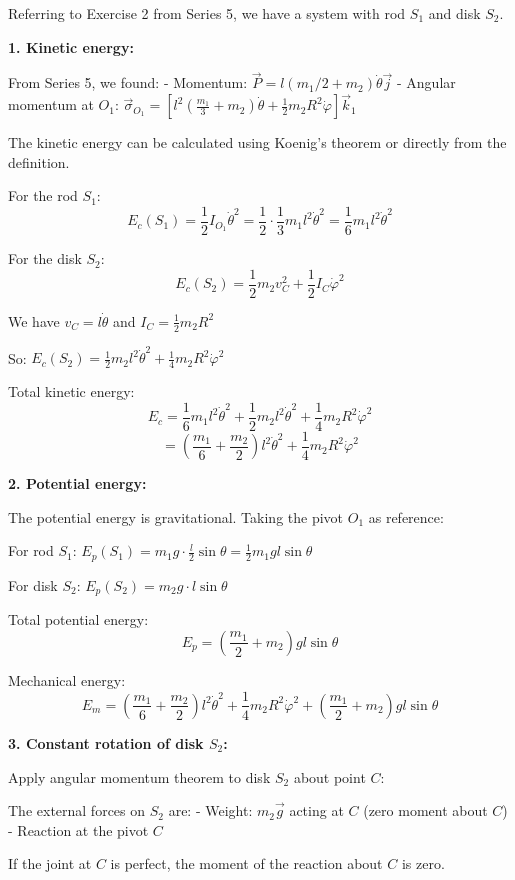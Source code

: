 \documentclass[12pt]{article}
\begin{document}
\begin{correctionbox}
Referring to Exercise 2 from Series 5, we have a system with rod $S_1$ and disk $S_2$.

\textbf{1. Kinetic energy:}

From Series 5, we found:
- Momentum: $\vec{P} = l(m_1/2 + m_2)\dot{\theta}\vec{j}$
- Angular momentum at $O_1$: $\vec{\sigma}_{O_1} = \left[l^2\left(\frac{m_1}{3} + m_2\right)\dot{\theta} + \frac{1}{2}m_2R^2\dot{\varphi}\right]\vec{k}_1$

The kinetic energy can be calculated using Koenig's theorem or directly from the definition.

For the rod $S_1$:
$$E_c(S_1) = \frac{1}{2}I_{O_1}\dot{\theta}^2 = \frac{1}{2} \cdot \frac{1}{3}m_1l^2\dot{\theta}^2 = \frac{1}{6}m_1l^2\dot{\theta}^2$$

For the disk $S_2$:
$$E_c(S_2) = \frac{1}{2}m_2v_C^2 + \frac{1}{2}I_C\dot{\varphi}^2$$

We have $v_C = l\dot{\theta}$ and $I_C = \frac{1}{2}m_2R^2$

So: $E_c(S_2) = \frac{1}{2}m_2l^2\dot{\theta}^2 + \frac{1}{4}m_2R^2\dot{\varphi}^2$

Total kinetic energy:
$$E_c = \frac{1}{6}m_1l^2\dot{\theta}^2 + \frac{1}{2}m_2l^2\dot{\theta}^2 + \frac{1}{4}m_2R^2\dot{\varphi}^2$$
$$= \left(\frac{m_1}{6} + \frac{m_2}{2}\right)l^2\dot{\theta}^2 + \frac{1}{4}m_2R^2\dot{\varphi}^2$$

\textbf{2. Potential energy:}

The potential energy is gravitational. Taking the pivot $O_1$ as reference:

For rod $S_1$: $E_p(S_1) = m_1g \cdot \frac{l}{2}\sin\theta = \frac{1}{2}m_1gl\sin\theta$

For disk $S_2$: $E_p(S_2) = m_2g \cdot l\sin\theta$

Total potential energy:
$$E_p = \left(\frac{m_1}{2} + m_2\right)gl\sin\theta$$

Mechanical energy:
$$E_m = \left(\frac{m_1}{6} + \frac{m_2}{2}\right)l^2\dot{\theta}^2 + \frac{1}{4}m_2R^2\dot{\varphi}^2 + \left(\frac{m_1}{2} + m_2\right)gl\sin\theta$$

\textbf{3. Constant rotation of disk $S_2$:}

Apply angular momentum theorem to disk $S_2$ about point $C$:

The external forces on $S_2$ are:
- Weight: $m_2\vec{g}$ acting at $C$ (zero moment about $C$)
- Reaction at the pivot $C$

If the joint at $C$ is perfect, the moment of the reaction about $C$ is zero.


\end{correctionbox}
\end{document}
